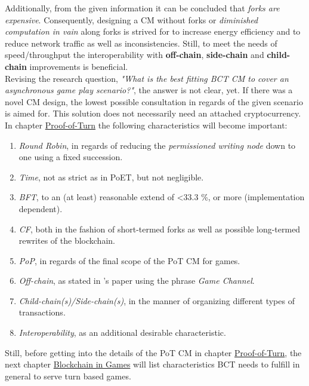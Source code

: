 \noindent Additionally, from the given information it can be concluded that \textit{forks are expensive}.
Consequently, designing a \gls{CM} without forks or \textit{diminished computation in vain} along forks is strived for to increase energy efficiency and to reduce network traffic as well as inconsistencies.
Still, to meet the needs of speed/throughput the interoperability with \textbf{off-chain}, \textbf{side-chain} and \textbf{child-chain} improvements is beneficial. \\
Revising the research question, \textit{"What is the best fitting \gls{BCT} \gls{CM} to cover an asynchronous game play scenario?"}, the answer is not clear, yet.
If there was a novel \gls{CM} design, the lowest possible consultation in regards of the given scenario is aimed for.
This solution does not necessarily need an attached cryptocurrency. \\
In chapter \hyperref[sec:PoT]{Proof-of-Turn} the following characteristics will become important:
\begin{enumerate}
	\item \textit{Round Robin}, in regards of reducing the \textit{permissioned writing node} down to one
	using a fixed succession.
	\item \textit{Time}, not as strict as in \gls{PoET}, but not negligible.
	\item \textit{\gls{BFT}}, to an (at least) reasonable extend of \textless $33.3$ \%, or more (implementation dependent).
	\item \textit{\gls{CF}}, both in the fashion of short-termed forks as well as possible long-termed rewrites of the blockchain.
	\item \textit{\gls{PoP}}, in regards of the final scope of the \gls{PoT} \gls{CM} for games.
	\item \textit{Off-chain}, as stated in \citet{Kraft.2016}'s paper using the phrase \textit{Game Channel}.
	\item \textit{Child-chain(s)/Side-chain(s)}, in the manner of organizing different types of transactions.
	\item \textit{Interoperability}, as an additional desirable characteristic.
\end{enumerate}

\noindent Still, before getting into the details of the \gls{PoT} \gls{CM} in chapter \hyperref[chap:PoT]{Proof-of-Turn},
the next chapter \hyperref[sec:BlockchainInGames]{Blockchain in Games} will list characteristics \gls{BCT} needs to fulfill in general to serve turn based games.


